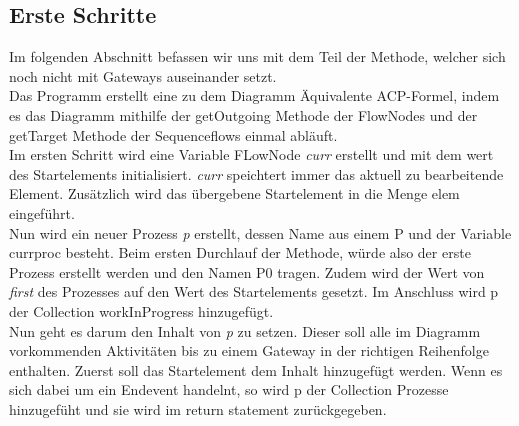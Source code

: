 \subsection{Erste Schritte}\label{Erste Schritte}
Im folgenden Abschnitt befassen wir uns mit dem Teil der Methode, welcher sich noch nicht mit Gateways auseinander setzt.\\
Das Programm erstellt eine zu dem Diagramm Äquivalente ACP-Formel, indem es das Diagramm mithilfe der getOutgoing Methode der FlowNodes und der getTarget Methode der Sequenceflows einmal abläuft.\\
Im ersten Schritt wird eine Variable FLowNode \textit{curr} erstellt und mit dem wert des Startelements initialisiert. \textit{curr} speichtert immer das aktuell zu bearbeitende Element. Zusätzlich wird das übergebene Startelement in die Menge elem eingeführt.\\
Nun wird ein neuer Prozess \textit{p} erstellt, dessen Name aus einem P und der Variable currproc besteht. Beim ersten Durchlauf der Methode, würde also der erste Prozess erstellt werden und den Namen P0 tragen. Zudem wird der Wert von \textit{first} des Prozesses auf den Wert des Startelements gesetzt. Im Anschluss wird p der Collection workInProgress hinzugefügt.\\
Nun geht es darum den Inhalt von \textit{p} zu setzen. Dieser soll alle im Diagramm vorkommenden Aktivitäten bis zu einem Gateway in der richtigen Reihenfolge enthalten.
Zuerst soll das Startelement dem Inhalt hinzugefügt werden. Wenn es sich dabei um ein Endevent handelnt, so wird p der Collection Prozesse hinzugefüht und sie wird im return statement zurückgegeben.\\
